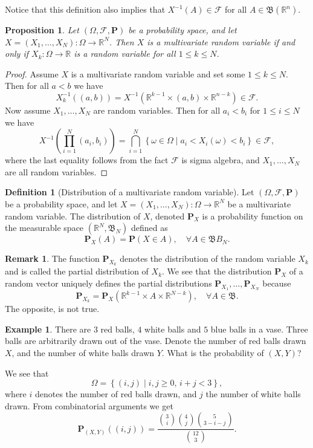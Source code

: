 \documentclass[11pt,a4paper]{article}
\theoremstyle{definition}
\newtheorem{definition}{Definition}[section]
\newtheorem{remark}{Remark}[section]
\newtheorem{example}{Example}[section]
\theoremstyle{plain}
\newtheorem{proposition}[theorem]{Proposition}
\newcommand{\R}{\mathbb{R}}
\newcommand{\set}[2]{ \left\{ #1 \mid #2 \right\} }
\begin{document}
  Notice that this definition also implies that $X^{-1}(A) \in \mathcal F$
  for all $A \in \mathfrak B\left(\R^n\right)$.

  \begin{proposition}
    Let $(\Omega, \mathcal F, \mathbf P)$ be a probability space, 
    and let $X = (X_1,\dots,X_N) \colon \Omega \to \R^N$. 
    Then $X$ is a multivariate random variable if and only if 
    $X_k \colon \Omega \to \R$ is a random variable for all $1 \le k \le N$.
  \end{proposition}
  \begin{proof}
    Assume $X$ is a multivariate random variable and set some $1 \le k \le N$.
    Then for all $a < b$ we have
    \[
      X_k^{-1}((a,b)) = 
      X^{-1}\left(\R^{k-1} \times (a,b) \times \R^{n-k}\right) \in
      \mathcal F.
    \]
    Now assume $X_1,\dots,X_N$ are random variables. Then for all $a_i < b_i$
    for $1 \le i \le N$ we have
    \[
      X^{-1}\left(\prod_{i=1}^{N} (a_i, b_i)\right) =
      \bigcap_{i=1}^{N}\set{\omega \in \Omega}{a_i < X_i(\omega) < b_i} \in
      \mathcal F,
    \]
    where the last equality follows from the fact $\mathcal F$ is  sigma
    algebra, and $X_1,\dots,X_N$ are all random variables.
  \end{proof}

  \begin{definition}[Distribution of a multivariate random variable]
    Let $(\Omega, \mathcal F, \mathbf P)$ be a probability space, 
    and let $X = (X_1,\dots,X_N) \colon \Omega \to \R^N$ be a multivariate
    random variable.
    The distribution of $X$, denoted $\mathbf P_X$ is a probability function
    on the measurable space $(\R^N, \mathfrak B_N)$ defined as
    \[
      \mathbf P_X(A) =
      \mathbf P(X \in A), \quad
      \forall A \in \mathfrak  BB_N.
    \]
  \end{definition}

  \begin{remark}
    The function $\mathbf P_{X_k}$ denotes the distribution of the random
    variable $X_k$ and is called the partial distribution of $X_k$.
    We see that the distribution $\mathbf P_X$ of a random vector uniquely
    defines the partial distributions $\mathbf P_{X_1},\dots,\mathbf P_{X_N}$
    because
    \[
      \mathbf P_{X_k} =
      \mathbf P_{X}\left(\R^{k-1} \times A \times \R^{N-k}\right),
      \quad \forall A \in \mathfrak B.
    \]
    The opposite, is not true.
  \end{remark}

  \begin{example}
    There are $3$ red balls, $4$ white balls and $5$ blue balls in a vase.
    Three balls are arbitrarily drawn out of the vase.
    Denote the number of red balls drawn $X$, and the number of white
    balls drawn $Y$. What is the probability of $(X,Y)$?

    We see that
    \[
      \Omega = \set{(i,j)}{i,j \geq 0,\, i + j < 3},
    \]
    where $i$ denotes the number of red balls drawn, and $j$ the number
    of white balls drawn. From combinatorial arguments we get
    \[
      \mathbf P_{(X,Y)}\left((i,j)\right) =
      \frac{\binom{3}{i}\binom{4}{j}\binom{5}{3-i-j}}{\binom{12}{3}}.
    \]
  \end{example}
\end{document}
